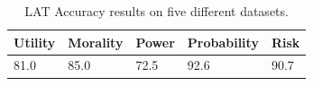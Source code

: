 
\begin{table}[ht]

\centering
\begin{tabular}{@{}lllll@{}}
\toprule
Utility & Morality & Power & Probability & Risk \\ \midrule
81.0    & 85.0     & 72.5     & 92.6        & 90.7 \\ \bottomrule
\end{tabular}
\caption{LAT Accuracy results on five different datasets.}
\label{tab:ethics_cm_results}
\end{table}